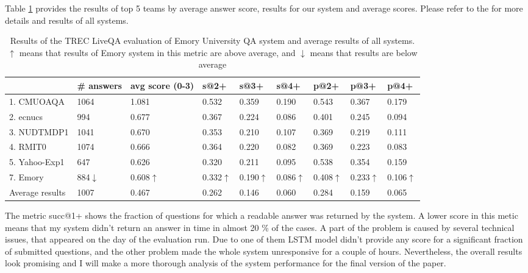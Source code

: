 Table \ref{table:liveqa-results} provides the results of top 5 teams by average answer score, results for our system and average scores.
Please refer to the \cite{overviewliveqa15} for more details and results of all systems.

\begin{table}
	\centering
	\begin{tabular}{|p{3cm}|p{2cm}|p{1.3cm}|p{1.3cm}|p{1.3cm}|p{1.3cm}|p{1cm}|p{1cm}|p{1cm}|}
		\hline
		& \# answers & avg score (0-3) & s@2+ & s@3+ & s@4+ & p@2+ &  p@3+ & p@4+ \\
		\hline
		1. CMUOAQA & 1064 & 1.081 & 0.532 & 0.359 & 0.190 & 0.543 & 0.367 & 0.179 \\
		2. ecnucs & 994 & 0.677 & 0.367 & 0.224 & 0.086 & 0.401 & 0.245 & 0.094\\
		3. NUDTMDP1 & 1041 & 0.670 & 0.353 & 0.210 & 0.107 & 0.369 & 0.219 & 0.111\\
		4. RMIT0 & 1074 & 0.666 & 0.364 & 0.220 & 0.082 & 0.369 & 0.223 & 0.083\\
		5. Yahoo-Exp1 & 647 & 0.626 & 0.320 & 0.211 & 0.095 & 0.538 & 0.354 & 0.159\\
		\hline
		7. Emory & 884$\downarrow$ & 0.608$\uparrow$ & 0.332$\uparrow$ & 0.190$\uparrow$ & 0.086$\uparrow$ & 0.408$\uparrow$ & 0.233$\uparrow$ & 0.106$\uparrow$\\
		\hline
		Average results & 1007 & 0.467 & 0.262 & 0.146 & 0.060 & 0.284 & 0.159 & 0.065\\
		\hline
	\end{tabular}
\caption{Results of the TREC LiveQA evaluation of Emory University QA system and average results of all systems. $\uparrow$ means that results of Emory system in this metric are above average, and $\downarrow$ means that results are below average}
\label{table:liveqa-results}
\end{table}

The metric succ@1+ shows the fraction of questions for which a readable answer was returned by the system.
A lower score in this metic means that my system didn't return an answer in time in almost 20 \% of the cases.
A part of the problem is caused by several technical issues, that appeared on the day of the evaluation run.
Due to one of them LSTM model didn't provide any score for a significant fraction of submitted questions, and the other problem made the whole system unresponsive for a couple of hours.
Nevertheless, the overall results look promising and I will make a more thorough analysis of the system performance for the final version of the paper.

